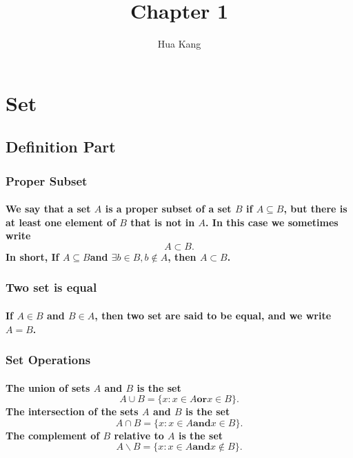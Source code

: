 \documentclass{article}
\title{Chapter 1}
\author{Hua Kang}
\begin{document}
    \maketitle
    \section{Set}
        \subsection{Definition Part}
            \subsubsection{Proper Subset}
                \paragraph{
                    We say that a set $A$ is a \textbf{proper subset} of a set $B$ if $A \subseteq B$, but there is at least one element of $B$ that is not in $A$. In this case we sometimes write
                    $$A \subset B.$$
                    In short, If $A\subseteq B$and $\exists b \in B , b \notin A$, then $A\subset B$.
                    }
                
            
            \subsubsection{Two set is equal}
                \paragraph{
                    If $A\in B$ and $B\in A$, then two set are said to be \textbf{equal}, and we write $A=B$.
                }
                
            
            \subsubsection{Set Operations}
                \paragraph{
                    The \textbf{union} of sets $A$ and $B$ is the set
                $$A \cup B =\{x:x\in A \textbf{or} x\in B\} .$$
                The \textbf{intersection} of the sets $A$ and $B$ is the set
                $$ A\cap B =\{x:x\in A \textbf{and}x\in B\}.$$
                The \textbf{complement of} $B$ \textbf{relative to} $A$ is the set
                $$A\backslash B=\{x:x\in A \textbf{and} x \notin B\}.$$
                }
                
\end{document}
